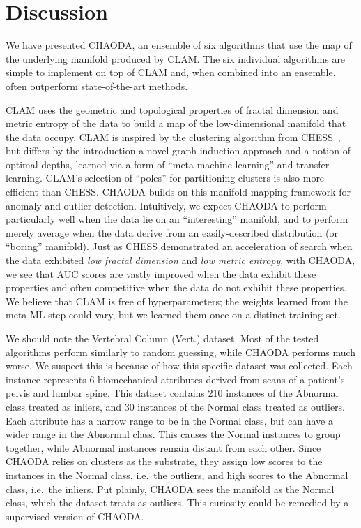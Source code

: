 \section{Discussion}
\label{sec:discussion}

We have presented CHAODA, an ensemble of six algorithms that use the map of the underlying manifold produced by CLAM\@.
The six individual algorithms are simple to implement on top of CLAM and, when combined into an ensemble, often outperform state-of-the-art methods.

CLAM uses the geometric and topological properties of fractal dimension and metric entropy of the data to build a map of the low-dimensional manifold that the data occupy.
CLAM is inspired by the clustering algorithm from CHESS~\cite{ishaq2019clustered}, but differs by the introduction a novel graph-induction approach and a notion of optimal depths, learned via a form of ``meta-machine-learning'' and transfer learning.
CLAM's selection of ``poles'' for partitioning clusters is also more efficient than CHESS.
CHAODA builds on this manifold-mapping framework for anomaly and outlier detection.
Intuitively, we expect CHAODA to perform particularly well when the data lie on an ``interesting'' manifold, and to perform merely average when the data derive from an easily-described distribution (or ``boring'' manifold).
Just as CHESS demonstrated an acceleration of search when the data exhibited \emph{low fractal dimension} and \emph{low metric entropy}, with CHAODA, we see that AUC scores are vastly improved when the data exhibit these properties and often competitive when the data do not exhibit these properties.
We believe that CLAM is free of hyperparameters; the weights learned from the meta-ML step could vary, but we learned them once on a distinct training set.

We should note the Vertebral Column (Vert.) dataset.
Most of the tested algorithms perform similarly to random guessing, while CHAODA performs much worse.
We suspect this is because of how this specific dataset was collected.
Each instance represents 6 biomechanical attributes derived from scans of a patient's pelvis and lumbar spine.
This dataset contains 210 instances of the Abnormal class treated as inliers, and 30 instances of the Normal class treated as outliers.
Each attribute has a narrow range to be in the Normal class, but can have a wider range in the Abnormal class.
This causes the Normal instances to group together, while Abnormal instances remain distant from each other.
Since CHAODA relies on clusters as the substrate, they assign low scores to the instances in the Normal class, i.e.\ the outliers, and high scores to the Abnormal class, i.e.\ the inliers.
Put plainly, CHAODA sees the manifold as the Normal class, which the dataset treats as outliers.
This curiosity could be remedied by a supervised version of CHAODA.

